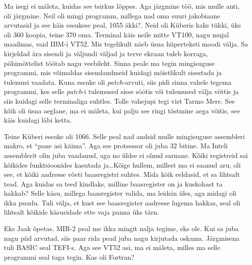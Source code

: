 Ma isegi ei  mäleta, kuidas see tsirkus lõppes. Aga järgmine töö, mis mulle 
anti, oli järgmine. Neil oli mingi programm, millega nad oma suuri jakobiaane 
arvutasid ja  see käis essukese peal, 1055 äkki?. Neid 
oli Küberis kaks tükki, üks oli 360 koopia, teine 370 oma. Terminal käis neile 
mitte VT100, nagu mujal maailmas, vaid IBM-i VT52. Mis tegelikult näeb  üsna 
hüperteksti moodi välja. Sa kirjeldad ära sisendi  ja väljundi väljad ja terve 
ekraan tuleb korraga, põhimõttelist töötab nagu veebileht. Sinna peale 
ma tegin mingisuguse programmi, mis võimaldas sisendandmeid kuidagi mõistlikult 
 sisestada ja tulemusi vaadata. Kuna essuke oli \emph{patch}-arvuti, siis pidi 
sinna vahele tegema programmi, kes selle \emph{patch}-i tulemused 
sisse söötis või tulemused välja võttis ja siis kuidagi  selle 
terminaliga suhtles. Tolle vahejupi tegi vist Tarmo Mere. See kõik oli üsna aeglane, ma ei mäleta, kui palju see ringi tõstmine 
aega võitis, see käis kuidagi läbi ketta.

Teine Küberi essuke oli 1066. Selle peal nad andsid mulle mingisuguse 
assembleri makro, et \enquote{pane asi käima}. Aga see protsessor oli juba 32 
bitine. Ma Inteli assemblerit olin juba vaadanud, aga no üldse ei olnud 
sarnane. Kõiki registreid sai kõikides funktsioonides kasutada ja\ldots Kõige 
hullem, millest ma ei saanud aru, oli see, et kõiki aadresse võeti 
baasregistri suhtes. Mida kõik eeldasid, et sa lihtsalt 
tead.  Aga kuidas sa teed kindlaks, milline baasregister on ja kuskohast ta 
hakkab? Selle käsu, millega baasregister valida, ma leidsin üles, aga 
midagi oli ikka puudu. Tuli välja, et kust see baasregister  aadresse 
lugema hakkas, seal oli lihtsalt kõikide käsuridade ette vaja panna üks 
tärn.
                 

Eks Jaak õpetas, MIR-2 peal me ikka mingit nalja 
tegime, 
eks ole. Kui sa juba nagu piid arvutad, siis paar rida pead juba nagu kirjutada 
oskama. Järgmisena tuli BASIC seal TEFI-s. Aga see VT52 asi, ma ei mäleta, 
milles ma selle programmi seal taga tegin. Kas oli Fortran? 


